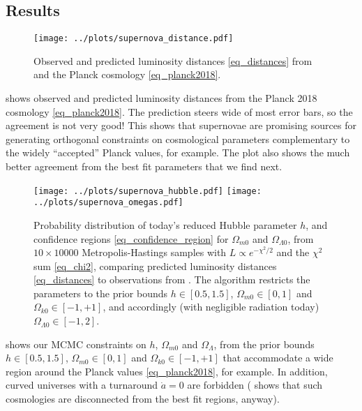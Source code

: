 \documentclass[10pt,a4paper]{article}
\begin{document}
\subsection{Results}

\begin{figure}[!b]
	\centering
	\texttt{[image: ../plots/supernova\_distance.pdf]}
	\caption{Observed and predicted luminosity distances \eqref{eq_distances} from \cite{betouleImprovedCosmologicalConstraints2014} and the Planck cosmology \eqref{eq_planck2018}.}
	\label{fig_luminosity_distances}
\end{figure}

 shows observed and predicted luminosity distances from the Planck 2018 cosmology \eqref{eq_planck2018}.
The prediction steers wide of most error bars, so the agreement is not very good!
This shows that supernovae are promising sources for generating orthogonal constraints on cosmological parameters complementary to the widely ``accepted'' Planck values, for example.
The plot also shows the much better agreement from the best fit parameters that we find next.

\begin{figure}[b]
	\centering
	\texttt{[image: ../plots/supernova\_hubble.pdf]}
	\texttt{[image: ../plots/supernova\_omegas.pdf]}
	\caption{%
		Probability distribution of today's reduced Hubble parameter $h$,
		and confidence regions \eqref{eq_confidence_region} for $\Omega_{m0}$ and $\Omega_{\Lambda0}$,
		from $10 \times 10000$ Metropolis-Hastings samples with $L \propto e^{-\chi^2/2}$ and the $\chi^2$ sum \eqref{eq_chi2},
		comparing predicted luminosity distances \eqref{eq_distances} to observations from \cite{betouleImprovedCosmologicalConstraints2014}.
		The algorithm restricts the parameters to the prior bounds $h \in [0.5, 1.5]$, $\Omega_{m0} \in [0, 1]$ and $\Omega_{k0} \in [-1, +1]$, and accordingly (with negligible radiation today) $\Omega_{\Lambda0} \in [-1, 2]$.
	}
	\label{fig_supernova_mcmc}
\end{figure}

 shows our MCMC constraints on $h$, $\Omega_{m0}$ and $\Omega_\Lambda$,
from the prior bounds $h \in [0.5, 1.5]$, $\Omega_{m0} \in [0, 1]$ and $\Omega_{k0} \in [-1, +1]$
that accommodate a wide region around the Planck values \eqref{eq_planck2018}, for example.
In addition, curved universes with a turnaround $\dot{a} = 0$ are forbidden
(\cite[Figure 11]{amanullahSpectraLightCurves2010} shows that such cosmologies are disconnected from the best fit regions, anyway).
\end{document}
